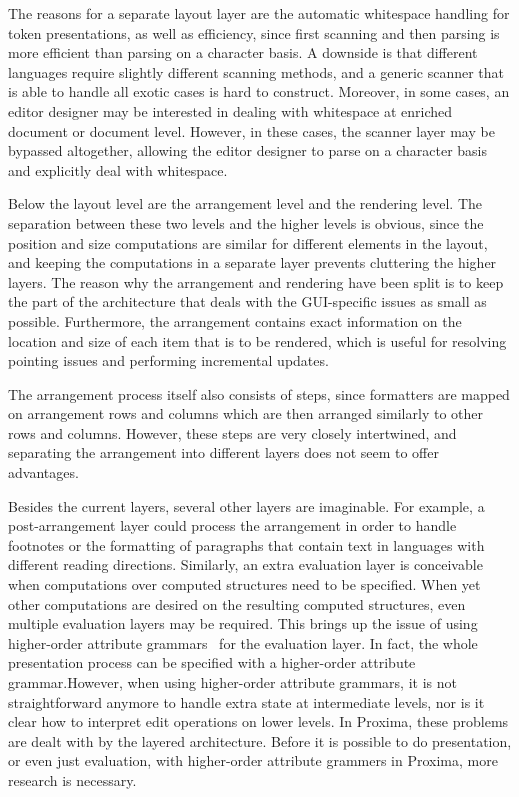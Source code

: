 The reasons for a separate layout layer are the automatic whitespace handling for token presentations, as well as efficiency, since first scanning and then parsing is more efficient than parsing on a character basis. A downside is that different languages require slightly different scanning methods, and a generic scanner that is able to handle all exotic cases is hard to construct. Moreover, in some cases, an editor designer may be interested in dealing with whitespace at enriched document or document level. However, in these cases, the scanner layer may be bypassed altogether, allowing the editor designer to parse on a character basis and explicitly deal with whitespace.

Below the layout level are the arrangement level and the rendering level. The separation between these two levels and the higher levels is obvious, since the position and size computations are similar for different elements in the layout, and keeping the computations in a separate layer prevents cluttering the higher layers. The reason why the arrangement and rendering have been split is to keep the part of the architecture that deals with the GUI-specific issues as small as possible. Furthermore, the arrangement contains exact information on the location and size of each item that is to be rendered, which is useful for resolving pointing issues and performing incremental updates. 

The arrangement process itself also consists of steps, since formatters are mapped on arrangement rows and columns which are then arranged similarly to other rows and columns. However, these steps are very closely intertwined, and separating the arrangement into different layers does not seem to offer advantages. 

Besides the current layers, several other layers are imaginable. For example, a post-arrangement layer could process the arrangement in order to handle footnotes or the formatting of paragraphs that contain text in languages with different reading directions. Similarly, an extra evaluation layer is conceivable when computations over computed structures need to be specified. When yet other computations are desired on the resulting computed structures, even multiple evaluation layers may be required. This brings up the issue of using higher-order attribute grammars~\cite{vogt89Hags} for the evaluation layer. \bc In fact, the whole presentation process can be specified with a higher-order attribute grammar.\ec However, when using higher-order attribute grammars, it is not straightforward anymore to handle extra state at intermediate levels, nor is it clear how to interpret edit operations on lower levels. In Proxima, these problems are dealt with by the layered architecture. Before it is possible to do presentation, or even just evaluation, with higher-order attribute grammers in Proxima, more research is necessary.

